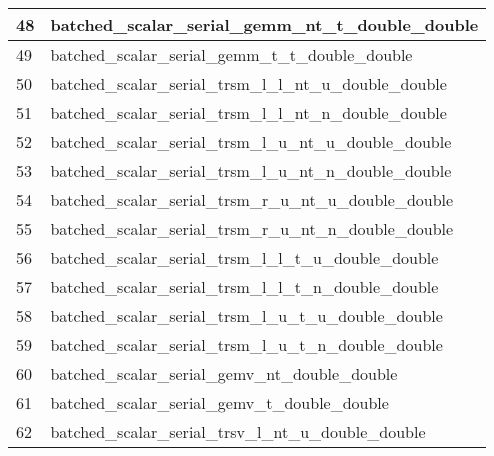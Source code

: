 \begin{table}[!htbp]
{            \hspace{1cm}

            \begin{tabular}{|>{\columncolor[HTML]{34FF34}}l |l|}
            \hline
            48                         & batched\_scalar\_serial\_gemm\_nt\_t\_double\_double                \\ \hline
            49                         & batched\_scalar\_serial\_gemm\_t\_t\_double\_double                 \\ \hline
            50                         & batched\_scalar\_serial\_trsm\_l\_l\_nt\_u\_double\_double          \\ \hline
            \cellcolor[HTML]{FE0000}51 & batched\_scalar\_serial\_trsm\_l\_l\_nt\_n\_double\_double          \\ \hline
            52                         & batched\_scalar\_serial\_trsm\_l\_u\_nt\_u\_double\_double          \\ \hline
            \cellcolor[HTML]{FE0000}53 & batched\_scalar\_serial\_trsm\_l\_u\_nt\_n\_double\_double          \\ \hline
            54                         & batched\_scalar\_serial\_trsm\_r\_u\_nt\_u\_double\_double          \\ \hline
            \cellcolor[HTML]{FE0000}55 & batched\_scalar\_serial\_trsm\_r\_u\_nt\_n\_double\_double          \\ \hline
            \cellcolor[HTML]{FF00FF}56 & batched\_scalar\_serial\_trsm\_l\_l\_t\_u\_double\_double           \\ \hline
            \cellcolor[HTML]{FF00FF}57 & batched\_scalar\_serial\_trsm\_l\_l\_t\_n\_double\_double           \\ \hline
            \cellcolor[HTML]{FF00FF}58 & batched\_scalar\_serial\_trsm\_l\_u\_t\_u\_double\_double           \\ \hline
            \cellcolor[HTML]{FF00FF}59 & batched\_scalar\_serial\_trsm\_l\_u\_t\_n\_double\_double           \\ \hline
            60                         & batched\_scalar\_serial\_gemv\_nt\_double\_double                   \\ \hline
            61                         & batched\_scalar\_serial\_gemv\_t\_double\_double                    \\ \hline
            62                         & batched\_scalar\_serial\_trsv\_l\_nt\_u\_double\_double             \\ \hline

\end{tabular}}
\end{table}
